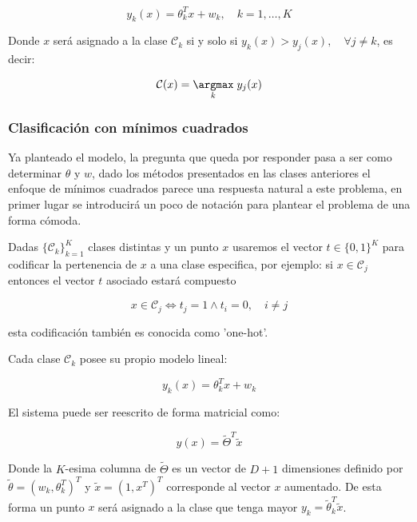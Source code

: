 \begin{equation}
    y_k(x) = \theta_k^Tx + w_k, \quad k=1,\ldots,K
\end{equation}

Donde $x$ será asignado a la clase $\mathcal{C}_k$ si y solo si $y_k(x) > y_j(x),\quad \forall j\neq k$, es decir:

\begin{equation}
    \mathcal{C}(x) = \underset{k}{\argmax}\hspace{1mm} y_j(x)
\end{equation}

\subsubsection{Clasificación con mínimos cuadrados}

Ya planteado el modelo, la pregunta que queda por responder pasa a ser como determinar $\theta$ y $w$, dado los métodos presentados en las clases anteriores el enfoque de mínimos cuadrados parece una respuesta natural a este problema, en primer lugar se introducirá un poco de notación para plantear el problema de una forma cómoda.

Dadas $\{\mathcal{C}_k\}_{k=1}^K$ clases distintas y un punto $x$ usaremos el vector $t\in\{0,1\}^K$ para codificar la pertenencia de $x$ a una clase especifica, por ejemplo: si $x\in\mathcal{C}_j$ entonces el vector $t$ asociado estará compuesto 

\begin{equation}
    x\in\mathcal{C}_j \Leftrightarrow t_j=1 \wedge t_i=0, \quad i\neq j
\end{equation}

esta codificación también es conocida como 'one-hot'.

Cada clase $\mathcal{C}_k$ posee su propio modelo lineal:

\begin{equation}
    y_k(x) = \theta_k^Tx + w_k \nonumber
\end{equation}

El sistema puede ser reescrito de forma matricial como:

\begin{equation}
    y(x) = \tilde{\Theta}^T\tilde{x}
\end{equation}

Donde la $K$-esima columna de $\tilde{\Theta}$ es un vector de $D+1$ dimensiones definido por $\tilde{\theta}=(w_k, \theta_k^T)^T$ y $\tilde{x}=(1,x^T)^T$ corresponde al vector $x$ aumentado. De esta forma un punto $x$ será asignado a la clase que tenga mayor $y_k=\tilde{\theta}_k^T\tilde{x}$.

